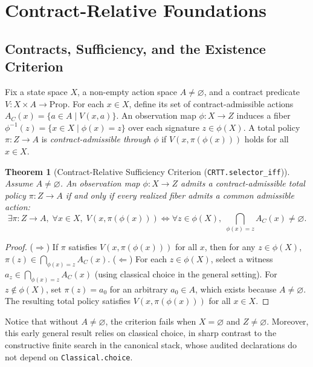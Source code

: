 \documentclass[10pt,letterpaper]{article}
\newtheorem{theorem}{Theorem}[section]
\begin{document}
\section{Contract-Relative Foundations}
\label{sec:foundations}

\subsection{Contracts, Sufficiency, and the Existence Criterion}
Fix a state space $X$, a non-empty action space $A \neq \varnothing$, and a contract predicate $V : X \times A \to \mathrm{Prop}$. For each $x \in X$, define its set of contract-admissible actions $A_C(x) = \{ a \in A \mid V(x, a) \}$. An observation map $\phi : X \to Z$ induces a fiber $\phi^{-1}(z) = \{ x \in X \mid \phi(x) = z \}$ over each signature $z \in \phi(X)$. A total policy $\pi : Z \to A$ is \emph{contract-admissible through $\phi$} if $V(x, \pi(\phi(x)))$ holds for all $x \in X$.

\begin{theorem}[Contract-Relative Sufficiency Criterion (\texttt{CRTT.selector\_iff})]
\label{thm:sufficiency}
Assume $A \neq \varnothing$. An observation map $\phi : X \to Z$ admits a contract-admissible total policy $\pi : Z \to A$ if and only if every realized fiber admits a common admissible action:
\begin{equation}
\label{eq:sufficiency}
\exists \pi : Z \to A,\; \forall x \in X,\; V(x, \pi(\phi(x)))
\iff
\forall z \in \phi(X),\; \bigcap_{\phi(x) = z} A_C(x) \neq \varnothing.
\end{equation}
\end{theorem}

\begin{proof}
($\Rightarrow$) If $\pi$ satisfies $V(x, \pi(\phi(x)))$ for all $x$, then for any $z \in \phi(X)$, $\pi(z) \in \bigcap_{\phi(x)=z} A_C(x)$.
($\Leftarrow$) For each $z \in \phi(X)$, select a witness $a_z \in \bigcap_{\phi(x)=z} A_C(x)$ (using classical choice in the general setting). For $z \notin \phi(X)$, set $\pi(z) = a_0$ for an arbitrary $a_0 \in A$, which exists because $A \neq \varnothing$. The resulting total policy satisfies $V(x, \pi(\phi(x)))$ for all $x \in X$.
\end{proof}

Notice that without $A \neq \varnothing$, the criterion fails when $X = \varnothing$ and $Z \neq \varnothing$. Moreover, this early general result relies on classical choice, in sharp contrast to the constructive finite search in the canonical stack, whose audited declarations do not depend on \texttt{Classical.choice}.
\end{document}

